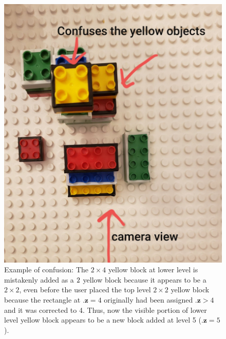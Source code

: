 \begin{figure}[h]
   \centering
   \includegraphics[scale=0.2]{figures/confusion.jpg}
   \caption[{Example of confusion}]{Example of confusion: The $2 \times 4$ yellow block at lower level is mistakenly added as a $2 \time 2$ yellow block because it appears to be a $2 \times 2$, even before the user placed the top level $2 \times 2$ yellow block because the rectangle at $\textbf{.z}=4$ originally had been assigned $\textbf{.z} > 4$ and it was corrected to 4. Thus, now the visible portion of lower level yellow block appears to be a new block added at level 5 ($\textbf{.z} = 5$).}
   \label{fig:fig_3-5}
\end{figure}
